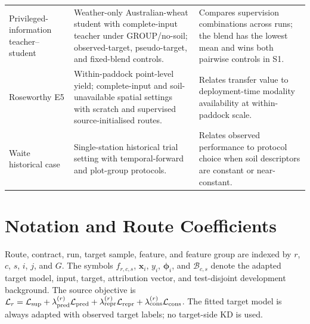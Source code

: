 \documentclass[runningheads]{venue/lncs/llncs}
\begin{document}
\begin{landscape}
\begin{longtable}{p{3.2cm}p{6.4cm}p{7.0cm}}
Privileged-information teacher--student & Weather-only Australian-wheat student with complete-input teacher under GROUP/no-soil; observed-target, pseudo-target, and fixed-blend controls. & Compares supervision combinations across runs; the blend has the lowest mean and wins both pairwise controls in S1.\\
Roseworthy E5 & Within-paddock point-level yield; complete-input and soil-unavailable spatial settings with scratch and supervised source-initialised routes. & Relates transfer value to deployment-time modality availability at within-paddock scale.\\
Waite historical case & Single-station historical trial setting with temporal-forward and plot-group protocols. & Relates observed performance to protocol choice when soil descriptors are constant or near-constant.\\
\bottomrule
\end{longtable}
\end{landscape}

\section{Notation and Route Coefficients}

Route, contract, run, target sample, feature, and feature group are indexed by $r$, $c$, $s$, $i$, $j$, and $G$. The symbols $f_{r,c,s}$, $\mathbf{x}_i$, $y_i$, $\boldsymbol{\phi}_i$, and $\mathcal{B}_{c,s}$ denote the adapted target model, input, target, attribution vector, and test-disjoint development background. The source objective is $\mathcal{L}_r=\mathcal{L}_{\rm sup}+\lambda_{\rm pred}^{(r)}\mathcal{L}_{\rm pred}+\lambda_{\rm repr}^{(r)}\mathcal{L}_{\rm repr}+\lambda_{\rm cons}^{(r)}\mathcal{L}_{\rm cons}$. The fitted target model is always adapted with observed target labels; no target-side KD is used.
\end{document}
